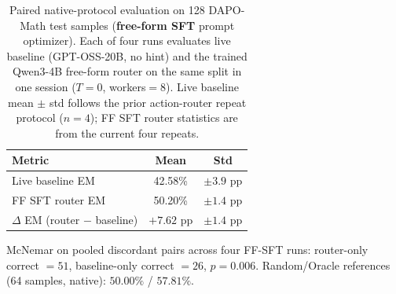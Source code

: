 \begin{table}[t]
\centering
\small
\setlength{\tabcolsep}{6pt}
\caption{Paired native-protocol evaluation on 128 DAPO-Math test samples (\textbf{free-form SFT} prompt optimizer).
Each of four runs evaluates live baseline (GPT-OSS-20B, no hint) and the trained Qwen3-4B free-form router on the same split in one session ($T{=}0$, workers$=8$).
Live baseline mean $\pm$ std follows the prior action-router repeat protocol ($n{=}4$); FF SFT router statistics are from the current four repeats.}
\label{tab:dapo-ff-sft-native-repeat}
\begin{tabular}{lcc}
\toprule
\textbf{Metric} & \textbf{Mean} & \textbf{Std} \\
\midrule
Live baseline EM            & 42.58\% & $\pm 3.9$ pp \\
FF SFT router EM            & 50.20\% & $\pm 1.4$ pp \\
$\Delta$ EM (router $-$ baseline) & \textcolor{green!60!black}{$+7.62$ pp} & \textcolor{green!60!black}{$\pm 1.4$ pp} \\
\bottomrule
\end{tabular}

\vspace{0.25em}
{\scriptsize
McNemar on pooled discordant pairs across four FF-SFT runs: router-only correct $=51$, baseline-only correct $=26$, $p=0.006$.
Random/Oracle references (64 samples, native): $50.00\%$ / $57.81\%$.
}
\end{table}

